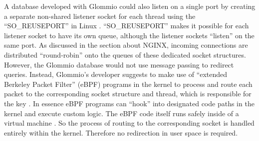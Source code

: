 A database developed with Glommio could also listen on a single port by creating a separate non-shared listener socket for each thread using the “SO\_REUSEPORT” in Linux \cite{man:socket}. “SO\_REUSEPORT” makes it possible for each listener socket to have its own queue, although the listener sockets “listen” on the same port. As discussed in the section about NGINX, incoming connections are distributed “round-robin” onto the queues of these dedicated socket structures. However, the Glommio database would not use message passing to redirect queries. Instead, Glommio’s developer suggests to make use of “extended Berkeley Packet Filter” (eBPF) programs in the kernel to process and route each packet to the corresponding socket structure and thread, which is responsible for the key \cite{glommio:ebpf}. In essence eBPF programs can “hook” into designated code paths in the kernel and execute custom logic. The eBPF code itself runs safely inside of a virtual machine  \cite{lwn:ebpf}. So the process of routing to the corresponding socket is handled entirely within the kernel. Therefore no redirection in user space is required.

